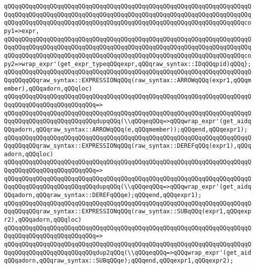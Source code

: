 \verb|qQQqqQQqqQQqqQQqqQQqqQQqqQQqqQQqqQQqqQQqqQQqqQQqqQQqqQQqqQQqqQQqqQQqqQQqqQQqqQQqqQQqqQQqqQQqqQQqqQQqqQQqqQQqqQQqqQQqqQQqqQQqqQQqqQQqqQQqqQQqqQQqqQQqqQQqqQQqqQQqqQQqqQQqqQQqqQQqqQQqqQQqqQQqqQQqqQQqqQQqqQQqqQQqcopy1=>expr,|\newline
\verb|qQQqqQQqqQQqqQQqqQQqqQQqqQQqqQQqqQQqqQQqqQQqqQQqqQQqqQQqqQQqqQQqqQQqqQQqqQQqqQQqqQQqqQQqqQQqqQQqqQQqqQQqqQQqqQQqqQQqqQQqqQQqqQQqqQQqqQQqqQQqqQQqqQQqqQQqqQQqqQQqqQQqqQQqqQQqqQQqqQQqqQQqqQQqqQQqqQQqqQQqqQQqqQQqcopy2=>wrap_expr'(get_expr_typeqQQqexpr,qQQqraw_syntax::IDqQQqpid)qQQq};|\newline
\newline
\verb|qQQqqQQqqQQqqQQqqQQqqQQqqQQqqQQqqQQqqQQqqQQqqQQqqQQqqQQqqQQqqQQqqQQqqQQqqQQqqQQqraw_syntax::EXPRESSIONqQQq(raw_syntax::ARROWqQQq(expr1,qQQqmember),qQQqadorn,qQQqloc)|\newline
\verb|qQQqqQQqqQQqqQQqqQQqqQQqqQQqqQQqqQQqqQQqqQQqqQQqqQQqqQQqqQQqqQQqqQQqqQQqqQQqqQQqqQQqqQQqqQQqqQQq=>|\newline
\verb|qQQqqQQqqQQqqQQqqQQqqQQqqQQqqQQqqQQqqQQqqQQqqQQqqQQqqQQqqQQqqQQqqQQqqQQqqQQqqQQqqQQqqQQqqQQqqQQqdupqQQq(\\qQQqeqQQq=>qQQqwrap_expr'(get_aidqQQqadorn,qQQqraw_syntax::ARROWqQQq(e,qQQqmember));qQQqend,qQQqexpr1);|\newline
\newline
\verb|qQQqqQQqqQQqqQQqqQQqqQQqqQQqqQQqqQQqqQQqqQQqqQQqqQQqqQQqqQQqqQQqqQQqqQQqqQQqqQQqraw_syntax::EXPRESSIONqQQq(raw_syntax::DEREFqQQq(expr1),qQQqadorn,qQQqloc)|\newline
\verb|qQQqqQQqqQQqqQQqqQQqqQQqqQQqqQQqqQQqqQQqqQQqqQQqqQQqqQQqqQQqqQQqqQQqqQQqqQQqqQQqqQQqqQQqqQQqqQQq=>|\newline
\verb|qQQqqQQqqQQqqQQqqQQqqQQqqQQqqQQqqQQqqQQqqQQqqQQqqQQqqQQqqQQqqQQqqQQqqQQqqQQqqQQqqQQqqQQqqQQqqQQqdupqQQq(\\qQQqeqQQq=>qQQqwrap_expr'(get_aidqQQqadorn,qQQqraw_syntax::DEREFqQQqe);qQQqend,qQQqexpr1);|\newline
\newline
\verb|qQQqqQQqqQQqqQQqqQQqqQQqqQQqqQQqqQQqqQQqqQQqqQQqqQQqqQQqqQQqqQQqqQQqqQQqqQQqqQQqraw_syntax::EXPRESSIONqQQq(raw_syntax::SUBqQQq(expr1,qQQqexpr2),qQQqadorn,qQQqloc)|\newline
\verb|qQQqqQQqqQQqqQQqqQQqqQQqqQQqqQQqqQQqqQQqqQQqqQQqqQQqqQQqqQQqqQQqqQQqqQQqqQQqqQQqqQQqqQQqqQQqqQQq=>|\newline
\verb|qQQqqQQqqQQqqQQqqQQqqQQqqQQqqQQqqQQqqQQqqQQqqQQqqQQqqQQqqQQqqQQqqQQqqQQqqQQqqQQqqQQqqQQqqQQqqQQqdup2qQQq(\\qQQqeqQQq=>qQQqwrap_expr'(get_aidqQQqadorn,qQQqraw_syntax::SUBqQQqe);qQQqend,qQQqexpr1,qQQqexpr2);|\newline
